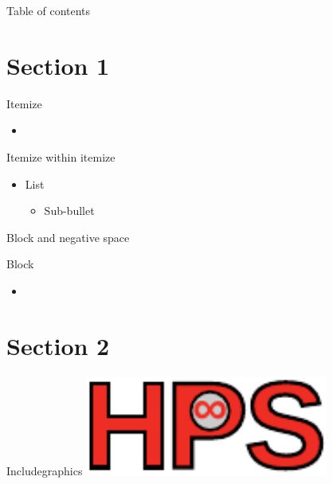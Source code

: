 \documentclass[compress,aspectratio=169]{beamer}
\begin{document}
\begin{frame}[plain]
	\titlepage
\end{frame}

\begin{frame}[t]{Table of contents}
  \tableofcontents[subsectionstyle=hide/hide]
\end{frame}


\section{Section 1}

\begin{frame}{Itemize}
  \begin{itemize}
    \item 
  \end{itemize}
\end{frame}

\begin{frame}{Itemize within itemize}
    \begin{itemize}
        \item List
            \begin{itemize}
                \item Sub-bullet
            \end{itemize}
    \end{itemize}
\end{frame}

\begin{frame}{Block and negative space}
    \vspace*{-3em} %
    \begin{block}{Block}
        \begin{itemize}
            \item 
        \end{itemize}
    \end{block}
\end{frame}


\section{Section 2}
\sectionIntroHidden %

\begin{frame}{Includegraphics}
    \centering
    \includegraphics[width=0.6\textwidth]{assets/hps-logo.pdf}\\
\end{frame}
\end{document}
